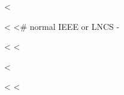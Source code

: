 
<%
\usepackage[%
  square,        %
  comma,         %
  numbers,       %
  sort           %
]{natbib}
<%
<# normal IEEE or LNCS -%
\usepackage[%
  square,        %
  comma,         %
  numbers,       %
  sort&compress %
]{natbib}
\fi
<%
<%

\renewcommand{\bibnumfmt}[1]{#1.}
<%

\renewcommand{\bibfont}{\normalfont\footnotesize}
<%
<%

\usepackage{etoolbox}
\makeatletter
\patchcmd{\NAT@test}{\else \NAT@nm}{\else \NAT@hyper@{\NAT@nm}}{}{}
\makeatother
